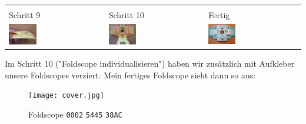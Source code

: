\begin{center}
\begin{tabular}{l|l|l}
				\multicolumn{3}{l}{} \\[-0.5em]
				Schritt 9 & Schritt 10 & Fertig \\
				\midrule
				\includegraphics[width=0.3\textwidth]{images/aufbau/9.jpg} &
				\includegraphics[width=0.3\textwidth]{images/aufbau/10.jpg} & 
				\includegraphics[width=0.3\textwidth]{images/aufbau/fertig.jpg} \\
			\end{tabular}
		\end{center}
		\vspace{1em}
		Im Schritt 10 ("Foldscope individualisieren") haben wir zusätzlich mit Aufkleber unsere Foldscopes verziert. Mein fertiges Foldscope sieht dann so aus:
		\begin{figure}[H]
			\centering
			\texttt{[image: cover.jpg]}
			\caption{\centering Foldscope \texttt{0002} \texttt{5445} \texttt{38AC}}
		\end{figure}
